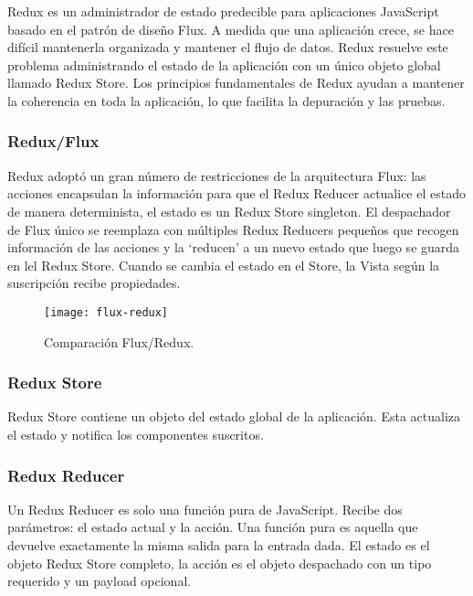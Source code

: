 Redux es un administrador de estado predecible para aplicaciones JavaScript basado en el patrón de diseño Flux. A medida que una aplicación crece, se hace difícil mantenerla organizada y mantener el flujo de datos. Redux resuelve este problema administrando el estado de la aplicación con un único objeto global llamado Redux Store. Los principios fundamentales de Redux ayudan a mantener la coherencia en toda la aplicación, lo que facilita la depuración y las pruebas.

\subsubsection{Redux/Flux}
Redux adoptó un gran número de restricciones de la arquitectura Flux: las acciones encapsulan la información para que el Redux Reducer actualice el estado de manera determinista, el estado es un Redux Store singleton. El despachador de Flux único se reemplaza con múltiples Redux Reducers pequeños que recogen información de las acciones y la `reducen' a un nuevo estado que luego se guarda en lel Redux Store. Cuando se cambia el estado en el Store, la Vista según la suscripción recibe propiedades.

\begin{figure}[H]
  \centering
  \texttt{[image: flux-redux]}
  \caption{Comparación Flux/Redux.}
\end{figure}

\subsubsection{Redux Store}
Redux Store contiene un objeto del estado global de la aplicación. Esta actualiza el estado y notifica los componentes suscritos.
\vspace{0.8cm}



\subsubsection{Redux Reducer}
Un Redux Reducer es solo una función pura de JavaScript. Recibe dos parámetros: el estado actual y la acción. Una función pura es aquella que devuelve exactamente la misma salida para la entrada dada. El estado es el objeto Redux Store completo, la acción es el objeto despachado con un tipo requerido y un payload opcional.
\vspace{0.8cm}

